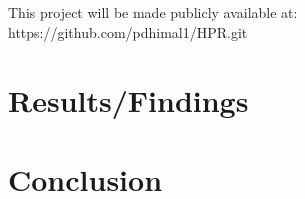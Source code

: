 \documentclass[11pt]{article}
\begin{document}
This project will be made publicly available at: https://github.com/pdhimal1/HPR.git

\section{Results/Findings}



\section{Conclusion}





\listoffigures

\lstlistoflistings


\end{document}
